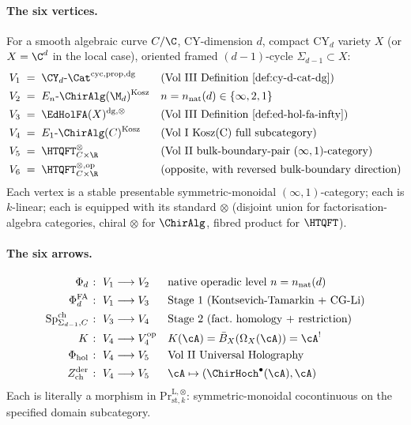 \paragraph*{The six vertices.} For a smooth algebraic curve $C/\C$,
CY-dimension $d$, compact CY$_d$ variety $X$ (or $X = \C^d$ in the
local case), oriented framed $(d-1)$-cycle $\Sigma_{d-1}\subset X$:
\begin{align*}
 V_1 &\;=\; \CY_d\text{-}\Cat^{\mathrm{cyc,prop,dg}}
 &&\text{(Vol III Definition
 \ref{def:cy-d-cat-dg})}\\
 V_2 &\;=\; E_n\text{-}\ChirAlg(\M_d)^{\mathrm{Kosz}}
 && n = n_{\mathrm{nat}}(d)\in\{\infty,2,1\}\\
 V_3 &\;=\; \EdHolFA(X)^{\mathrm{dg},\otimes}
 &&\text{(Vol III Definition
 \ref{def:ed-hol-fa-infty})}\\
 V_4 &\;=\; E_1\text{-}\ChirAlg(C)^{\mathrm{Kosz}}
 &&\text{(Vol I Kosz(C) full subcategory)}\\
 V_5 &\;=\; \HTQFT_{C\times\R}^{\otimes}
 &&\text{(Vol II bulk-boundary-pair
 $(\infty,1)$-category)}\\
 V_6 &\;=\; \HTQFT_{C\times\R}^{\otimes,\mathrm{op}}
 &&\text{(opposite, with reversed bulk-boundary
 direction)}
\end{align*}
Each vertex is a stable presentable symmetric-monoidal
$(\infty,1)$-category; each is $k$-linear; each is equipped with its
standard $\otimes$ (disjoint union for factorisation-algebra
categories, chiral $\otimes$ for $\ChirAlg$, fibred product for
$\HTQFT$).

\paragraph*{The six arrows.}
\begin{align*}
 \Phi_d &\;\colon\; V_1 \longrightarrow V_2 &&\text{native operadic
 level $n=n_{\mathrm{nat}}(d)$}\\
 \Phi^{\mathrm{FA}}_d &\;\colon\; V_1 \longrightarrow V_3 && \text{Stage 1
 (Kontsevich-Tamarkin + CG-Li)}\\
 \mathrm{Sp}^{\mathrm{ch}}_{\Sigma_{d-1},C} &\;\colon\; V_3 \longrightarrow
 V_4 && \text{Stage 2 (fact.~homology + restriction)}\\
 K &\;\colon\; V_4 \longrightarrow V_4^{\mathrm{op}} &&
 K(\cA)=\bar B_X(\Omega_X(\cA))=\cA^!\\
 \Phi_{\mathrm{hol}} &\;\colon\; V_4 \longrightarrow V_5 &&
 \text{Vol II Universal Holography}\\
 Z^{\mathrm{der}}_{\mathrm{ch}} &\;\colon\; V_4 \longrightarrow V_5 &&
 \cA\mapsto(\ChirHoch^\bullet(\cA), \cA)
\end{align*}
Each is literally a morphism in
$\mathrm{Pr}^{\mathrm{L},\otimes}_{\mathrm{st},k}$: symmetric-monoidal
cocontinuous on the specified domain subcategory.

